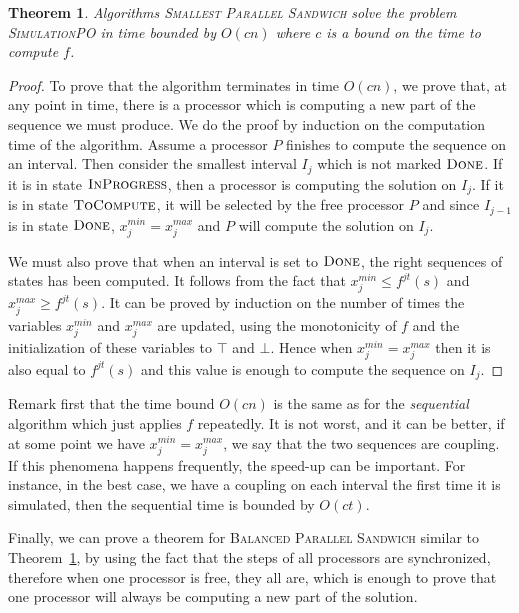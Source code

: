 \documentclass[a4paper,10pt]{article}
\newtheorem{theorem}{Theorem}
\begin{document}
 
 \begin{theorem}\label{th:alg_ok}
  Algorithms \textsc{Smallest Parallel Sandwich} solve the problem \textsc{SimulationPO} in time bounded by $O(cn)$ where $c$ is a bound on the time to compute $f$.
  \end{theorem}
  
\begin{proof}
To prove that the algorithm terminates in time $O(cn)$, we prove that, at any point in time, there is a processor which is computing a new part of the sequence we must produce. We do the proof by induction on the computation time of the algorithm. Assume a processor $P$ finishes to compute the sequence on an interval. Then consider the smallest interval $I_j$ which is not marked $\textsc{Done}$. If it is in state $\textsc{InProgress}$, then a processor is computing the solution on $I_j$. If it is in state $\textsc{ToCompute}$, it will be selected by the free processor $P$ and since $I_{j-1}$ is in state $\textsc{Done}$, $x_j^{min} = x_j^{max}$ and $P$ will compute the solution on $I_j$.

We must also prove that when an interval is set to $\textsc{Done}$, the right sequences of states has been computed. 
It follows from the fact that  $x_j^{min} \leq f^{jt}(s)$ and $x_j^{max} \geq f^{jt}(s)$. It can be proved by induction on the number of times the variables $x_j^{min}$ and  $x_j^{max}$ are updated, using the monotonicity of $f$ and the initialization of these variables to $\top$ and $\bot$. Hence when $x_j^{min} = x_j^{max}$ then it is also equal to $f^{jt}(s)$ and this value is enough to 
compute the sequence on $I_j$. 
\end{proof}

Remark first that the time bound $O(cn)$ is the same as for the \emph{sequential} algorithm which just applies
$f$ repeatedly. It is not worst, and it can be better, if at some point we have  $x_j^{min} = x_j^{max}$, we say that the 
two sequences are coupling. If this phenomena happens frequently, the speed-up can be important. 
For instance, in the best case, we have a coupling on each interval the first time it is simulated, then the sequential time is bounded by $O(ct)$.

Finally, we can prove a theorem for \textsc{Balanced Parallel Sandwich} similar to Theorem~\ref{th:alg_ok},
by using the fact that the steps of all processors are synchronized, therefore when one processor is free, they all are, which is enough to prove that one processor will always be computing a new part of the solution.
\end{document}
